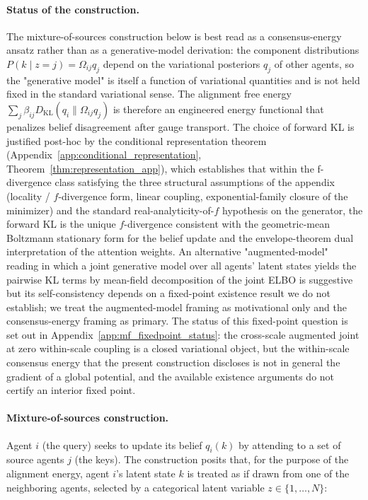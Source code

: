 \documentclass[11pt]{article}
\begin{document}
\paragraph{Status of the construction.} The mixture-of-sources construction below is best read as a consensus-energy ansatz rather than as a generative-model derivation: the component distributions $P(k \mid z{=}j) = \Omega_{ij}q_j$ depend on the variational posteriors $q_j$ of other agents, so the "generative model" is itself a function of variational quantities and is not held fixed in the standard variational sense. The alignment free energy $\sum_j \beta_{ij} D_{\mathrm{KL}}(q_i \| \Omega_{ij}q_j)$ is therefore an engineered energy functional that penalizes belief disagreement after gauge transport. The choice of forward KL is justified post-hoc by the conditional representation theorem (Appendix~\ref{app:conditional_representation}, Theorem~\ref{thm:representation_app}), which establishes that within the f-divergence class satisfying the three structural assumptions of the appendix (locality / $f$-divergence form, linear coupling, exponential-family closure of the minimizer) and the standard real-analyticity-of-$f$ hypothesis on the generator, the forward KL is the unique $f$-divergence consistent with the geometric-mean Boltzmann stationary form for the belief update and the envelope-theorem dual interpretation of the attention weights. An alternative "augmented-model" reading in which a joint generative model over all agents' latent states yields the pairwise KL terms by mean-field decomposition of the joint ELBO is suggestive but its self-consistency depends on a fixed-point existence result we do not establish; we treat the augmented-model framing as motivational only and the consensus-energy framing as primary. The status of this fixed-point question is set out in Appendix~\ref{app:mf_fixedpoint_status}: the cross-scale augmented joint at zero within-scale coupling is a closed variational object, but the within-scale consensus energy that the present construction discloses is not in general the gradient of a global potential, and the available existence arguments do not certify an interior fixed point.

\paragraph{Mixture-of-sources construction.}
Agent $i$ (the query) seeks to update its belief $q_i(k)$ by attending to a set of source agents $j$ (the keys). The construction posits that, for the purpose of the alignment energy, agent $i$'s latent state $k$ is treated as if drawn from one of the neighboring agents, selected by a categorical latent variable $z \in \{1, \ldots, N\}$:
\end{document}
